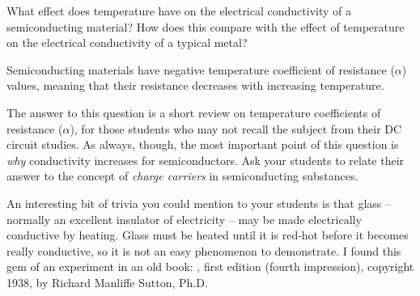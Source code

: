 

What effect does temperature have on the electrical conductivity of a semiconducting material?  How does this compare with the effect of temperature on the electrical conductivity of a typical metal?







Semiconducting materials have negative temperature coefficient of resistance ($\alpha$) values, meaning that their resistance decreases with increasing temperature.







The answer to this question is a short review on temperature coefficients of resistance ($\alpha$), for those students who may not recall the subject from their DC circuit studies.  As always, though, the most important point of this question is {\it why} conductivity increases for semiconductors.  Ask your students to relate their answer to the concept of {\it charge carriers} in semiconducting substances.

An interesting bit of trivia you could mention to your students is that glass -- normally an excellent insulator of electricity -- may be made electrically conductive by heating.  Glass must be heated until it is red-hot before it becomes really conductive, so it is not an easy phenomenon to demonstrate.  I found this gem of an experiment in an old book: , first edition (fourth impression), copyright 1938, by Richard Manliffe Sutton, Ph.D.




